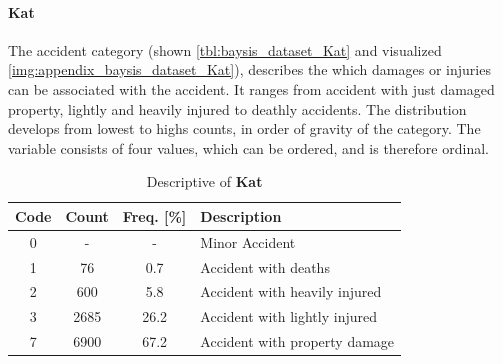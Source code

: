 \paragraph{Kat}
\label{baysis_dataset_Kat}
The accident category (shown \autoref{tbl:baysis_dataset_Kat} and visualized \autoref{img:appendix_baysis_dataset_Kat}), describes the which damages or injuries can be associated with the accident. It ranges from accident with just  damaged property, lightly and heavily injured to deathly accidents. The distribution develops from lowest to highs counts, in order of gravity of the category. The variable consists of four values, which can be ordered, and is therefore ordinal.
\begin{table}[!ht]
	\centering
	\small
	\begin{tabular}{c|c|c|l} 
		\toprule
		Code & Count & Freq. [\%] & Description \\ 
		\midrule
 		0 	& - 	& 	-	& Minor Accident  \\
 		1 	& 76 	& 0.7 	& Accident with deaths  \\ 
 		2 	& 600	& 5.8	& Accident with heavily injured  \\
 		3 	& 2685	& 26.2	& Accident with lightly injured  \\
		7 	& 6900	& 67.2	& Accident with property damage  \\
		\bottomrule
	\end{tabular}
	\caption{Descriptive of \textbf{Kat}}
	\label{tbl:baysis_dataset_Kat}
	\vspace{-8mm}
\end{table}

